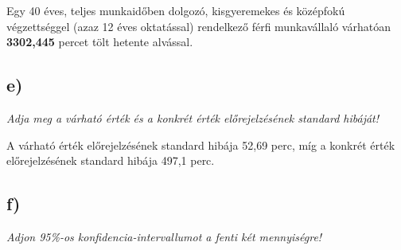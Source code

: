 \documentclass[
]{article}
\newenvironment{Shaded}{\begin{snugshade}}{\end{snugshade}}
\newcommand{\DataTypeTok}[1]{\textcolor[rgb]{0.13,0.29,0.53}{#1}}
\newcommand{\DecValTok}[1]{\textcolor[rgb]{0.00,0.00,0.81}{#1}}
\newcommand{\KeywordTok}[1]{\textcolor[rgb]{0.13,0.29,0.53}{\textbf{#1}}}
\newcommand{\NormalTok}[1]{#1}
\newcommand{\OperatorTok}[1]{\textcolor[rgb]{0.81,0.36,0.00}{\textbf{#1}}}
\newcommand{\StringTok}[1]{\textcolor[rgb]{0.31,0.60,0.02}{#1}}
\begin{document}
Egy 40 éves, teljes munkaidőben dolgozó, kisgyeremekes és középfokú
végzettséggel (azaz 12 éves oktatással) rendelkező férfi munkavállaló
várhatóan \textbf{3302,445} percet tölt hetente alvással.

\hypertarget{e}{%
\subsection{e)}\label{e}}

\emph{Adja meg a várható érték és a konkrét érték előrejelzésének
standard hibáját!}

\begin{Shaded}
\end{Shaded}

A várható érték előrejelzésének standard hibája 52,69 perc, míg a
konkrét érték előrejelzésének standard hibája 497,1 perc.

\hypertarget{f}{%
\subsection{f)}\label{f}}

\emph{Adjon 95\%-os konfidencia-intervallumot a fenti két mennyiségre!}
\end{document}
